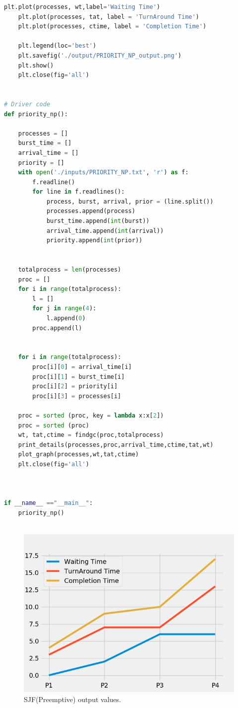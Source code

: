 \documentclass[11pt,a4paper]{report}
\begin{document}
\begin{lstlisting}[language=Python,caption=SJF Preemptive Source code,breaklines=true,postbreak=\mbox{\textcolor{red}{$\hookrightarrow$}\space},]
	plt.plot(processes, wt,label='Waiting Time')
	plt.plot(processes, tat, label = 'TurnAround Time')
	plt.plot(processes, ctime, label = 'Completion Time')

	plt.legend(loc='best')
	plt.savefig('./output/PRIORITY_NP_output.png')
	plt.show()
	plt.close(fig='all')


# Driver code  
def priority_np():

	processes = []
	burst_time = []
	arrival_time = []
	priority = []
	with open('./inputs/PRIORITY_NP.txt', 'r') as f:
		f.readline()
		for line in f.readlines():
			process, burst, arrival, prior = (line.split())
			processes.append(process)
			burst_time.append(int(burst))
			arrival_time.append(int(arrival))
			priority.append(int(prior)) 
	

	totalprocess = len(processes)
	proc = []
	for i in range(totalprocess): 
		l = [] 
		for j in range(4): 
			l.append(0) 
		proc.append(l) 
	
	
	for i in range(totalprocess):
		proc[i][0] = arrival_time[i]
		proc[i][1] = burst_time[i]
		proc[i][2] = priority[i]
		proc[i][3] = processes[i]

	proc = sorted (proc, key = lambda x:x[2]) 
	proc = sorted (proc) 
	wt, tat,ctime = findgc(proc,totalprocess) 
	print_details(processes,proc,arrival_time,ctime,tat,wt)
	plot_graph(processes,wt,tat,ctime)
	plt.close(fig='all')
	


if __name__ =="__main__": 
	priority_np()
	
\end{lstlisting}

{\begin{figure}[H]
	\centering
	\includegraphics[scale=0.75]{./img/PRIORITY_NP_output.png}
	\caption{SJF(Preemptive) output values.}
\end{figure}}
\end{document}
